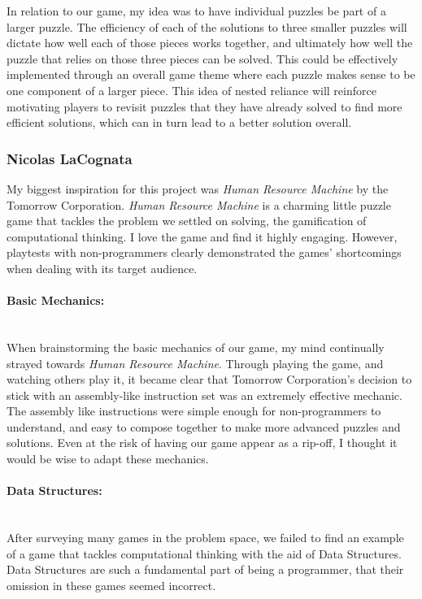 In relation to our game, my idea was to have individual puzzles be part of a larger puzzle. The efficiency of each
of the solutions to three smaller puzzles will dictate how well each of those pieces works together, and ultimately
how well the puzzle that relies on those three pieces can be solved. This could be effectively implemented through
an overall game theme where each puzzle makes sense to be one component of a larger piece. This idea of nested
reliance will reinforce motivating players to revisit puzzles that they have already solved to find more efficient solutions,
which can in turn lead to a better solution overall.\\

\subsubsection{Nicolas LaCognata}
My biggest inspiration for this project was \textit{Human Resource Machine} by the Tomorrow Corporation.
\textit{Human Resource Machine} is a charming little puzzle game that tackles the problem we settled on solving,
the gamification of computational thinking. I love the game and find it highly engaging. However, playtests
with non-programmers clearly demonstrated the games' shortcomings when dealing with its target audience.

\paragraph{Basic Mechanics:} ~\\
When brainstorming the basic mechanics of our game, my mind continually strayed towards \textit{Human Resource Machine}.
Through playing the game, and watching others play it, it became clear that Tomorrow Corporation's decision to stick with
an assembly-like instruction set was an extremely effective mechanic.\\

The assembly like instructions were simple enough for non-programmers to understand, and easy to compose 
together to make more advanced puzzles and solutions. Even at the risk of having our game appear as a rip-off, 
I thought it would be wise to adapt these mechanics.\\

\paragraph{Data Structures:} ~\\
After surveying many games in the problem space, we failed to find an example of a game that tackles computational thinking
with the aid of Data Structures. Data Structures are such a fundamental part of being a programmer, that their omission in these
games seemed incorrect.\\

